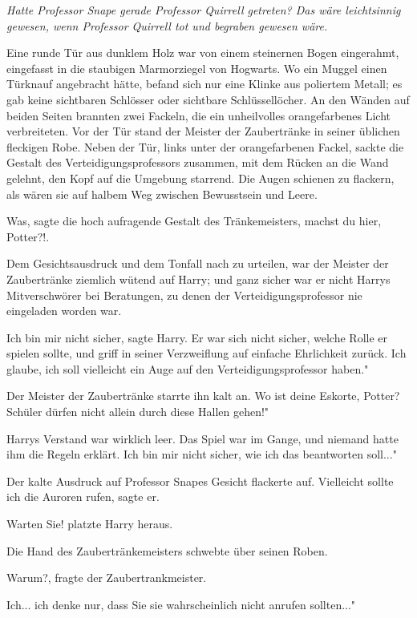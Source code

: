 \emph{Hatte Professor Snape gerade Professor Quirrell getreten? Das wäre leichtsinnig gewesen, wenn Professor Quirrell tot und begraben gewesen wäre. }

Eine runde Tür aus dunklem Holz war von einem steinernen Bogen eingerahmt,
eingefasst in die staubigen Marmorziegel von Hogwarts. Wo ein Muggel einen
Türknauf angebracht hätte, befand sich nur eine Klinke aus poliertem Metall; es
gab keine sichtbaren Schlösser oder sichtbare Schlüssellöcher. An den Wänden auf
beiden Seiten brannten zwei Fackeln, die ein unheilvolles orangefarbenes Licht
verbreiteten. Vor der Tür stand der Meister der Zaubertränke in seiner üblichen
fleckigen Robe. Neben der Tür, links unter der orangefarbenen Fackel, sackte die
Gestalt des Verteidigungsprofessors zusammen, mit dem Rücken an die Wand
gelehnt, den Kopf auf die Umgebung starrend. Die Augen schienen zu flackern, als
wären sie auf halbem Weg zwischen Bewusstsein und Leere.

\glqq Was\grqq{}, sagte die hoch aufragende Gestalt des Tränkemeisters, \glqq
machst du hier, Potter?!\grqq{}.

Dem Gesichtsausdruck und dem Tonfall nach zu urteilen, war der Meister der
Zaubertränke ziemlich wütend auf Harry; und ganz sicher war er nicht Harrys
Mitverschwörer bei Beratungen, zu denen der Verteidigungsprofessor nie
eingeladen worden war.

\glqq Ich bin mir nicht sicher\grqq{}, sagte Harry. Er war sich nicht sicher,
welche Rolle er spielen sollte, und griff in seiner Verzweiflung auf einfache
Ehrlichkeit zurück. \glqq Ich glaube, ich soll vielleicht ein Auge auf den
Verteidigungsprofessor haben."

Der Meister der Zaubertränke starrte ihn kalt an. \glqq Wo ist deine Eskorte,
Potter? Schüler dürfen nicht allein durch diese Hallen gehen!"

Harrys Verstand war wirklich leer. Das Spiel war im Gange, und niemand hatte ihm
die Regeln erklärt. \glqq Ich bin mir nicht sicher, wie ich das beantworten
soll..."

Der kalte Ausdruck auf Professor Snapes Gesicht flackerte auf. \glqq Vielleicht
sollte ich die Auroren rufen\grqq{}, sagte er.

\glqq Warten Sie!\grqq{} platzte Harry heraus.

Die Hand des Zaubertränkemeisters schwebte über seinen Roben.

\glqq Warum?\grqq{}, fragte der Zaubertrankmeister.

\glqq Ich... ich denke nur, dass Sie sie wahrscheinlich nicht anrufen
sollten..."

